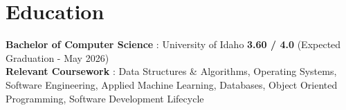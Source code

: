 
\vspace{-10pt}
\section*{Education}
\textbf{Bachelor of Computer Science} : University of Idaho \hfill \textbf{3.60 / 4.0} (Expected Graduation - May 2026) \\
\textbf{Relevant Coursework} : Data Structures \& Algorithms, Operating Systems, Software Engineering, Applied Machine Learning, Databases, Object Oriented Programming, Software Development Lifecycle